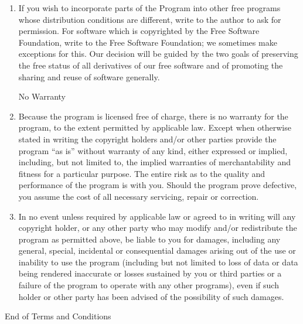 \documentclass{book}
\begin{document}
{\begin{enumerate}
Each version is given a distinguishing version number.  If the Program
specifies a version number of this License which applies to it and ``any
later version'', you have the option of following the terms and conditions
either of that version or of any later version published by the Free
Software Foundation.  If the Program does not specify a version number of
this License, you may choose any version ever published by the Free Software
Foundation.

\item
If you wish to incorporate parts of the Program into other free
programs whose distribution conditions are different, write to the author
to ask for permission.  For software which is copyrighted by the Free
Software Foundation, write to the Free Software Foundation; we sometimes
make exceptions for this.  Our decision will be guided by the two goals
of preserving the free status of all derivatives of our free software and
of promoting the sharing and reuse of software generally.

\begin{center}
{\Large\sc
No Warranty
}
\end{center}

\item
{\sc Because the program is licensed free of charge, there is no warranty
for the program, to the extent permitted by applicable law.  Except when
otherwise stated in writing the copyright holders and/or other parties
provide the program ``as is'' without warranty of any kind, either expressed
or implied, including, but not limited to, the implied warranties of
merchantability and fitness for a particular purpose.  The entire risk as
to the quality and performance of the program is with you.  Should the
program prove defective, you assume the cost of all necessary servicing,
repair or correction.}

\item
{\sc In no event unless required by applicable law or agreed to in writing
will any copyright holder, or any other party who may modify and/or
redistribute the program as permitted above, be liable to you for damages,
including any general, special, incidental or consequential damages arising
out of the use or inability to use the program (including but not limited
to loss of data or data being rendered inaccurate or losses sustained by
you or third parties or a failure of the program to operate with any other
programs), even if such holder or other party has been advised of the
possibility of such damages.}

\end{enumerate}


\begin{center}
{\Large\sc End of Terms and Conditions}
\end{center}
}


%
%
%
%
%

%
%

\end{document}
